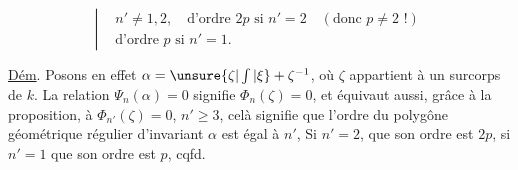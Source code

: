 
\[
\left|\begin{aligned}
&n'\ne1,2,\quad\text{d'ordre }2p\text{ si }n'=2\quad(\text{donc }p\ne2\text{ !})\\
&\text{d'ordre }p\text{ si }n'=1.
\end{aligned}\right.
\]

\uline{Dém}. Posons en effet $\alpha=\unsure{\zeta|\int|\xi}+\zeta^{-1}$, où $\zeta$ appartient à un surcorps de $k$. La relation $\Psi_n(\alpha)=0$ signifie $\Phi_n(\zeta)=0$, et équivaut aussi, grâce à la proposition, à $\Phi_{n'}(\zeta)=0$,     $n'\geq3$, celà signifie que l'ordre du polygône géométrique régulier d'invariant $\alpha$ est égal à $n'$, Si $n'=2$, que son ordre est $2p$, si $n'=1$ que son ordre est $p$, \hfill cqfd.

